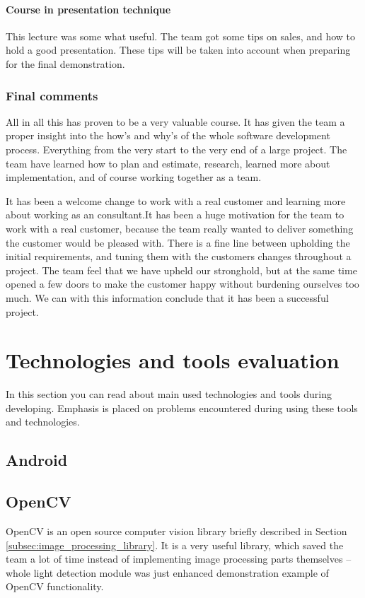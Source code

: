 \paragraph{Course in presentation technique}
This lecture was some what useful. The team got some tips on sales, and how to hold a good presentation. These tips will be taken into account when preparing for the final demonstration. 

\subsubsection{Final comments}

All in all this has proven to be a very valuable course. It has given the team a proper insight into the how's and why's of the whole software development process. Everything from the very start to the very end of a large project. The team have learned how to plan and estimate, research, learned more about implementation, and of course working together as a team. 

It has been a welcome change to work with a real customer and learning more about working as an consultant.It has been a huge motivation for the team to work with a real customer, because the team really wanted to deliver something the customer would be pleased with. There is a fine line between upholding the initial requirements, and tuning them with the customers changes throughout a project. The team feel that we have upheld our stronghold, but at the same time opened a few doors to
make the customer happy without burdening ourselves too much. We can with this information
conclude that it has been a successful project.

\section{Technologies and tools evaluation}
In this section you can read about main used technologies and tools during developing.
Emphasis is placed on problems encountered during using these tools and technologies.

\subsection{Android}

\subsection{OpenCV}
OpenCV is an open source computer vision library briefly described in Section \ref{subsec:image_processing_library}.
It is a very useful library, which saved the team a lot of time instead of implementing image processing parts themselves
 -- whole light detection module was just enhanced demonstration example of OpenCV functionality.

